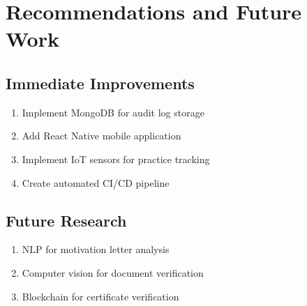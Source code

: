 \documentclass[12pt,a4paper]{report}
\begin{document}
\chapter{Recommendations and Future Work}

\section{Immediate Improvements}
\begin{enumerate}
    \item Implement MongoDB for audit log storage
    \item Add React Native mobile application
    \item Implement IoT sensors for practice tracking
    \item Create automated CI/CD pipeline
\end{enumerate}

\section{Future Research}
\begin{enumerate}
    \item NLP for motivation letter analysis
    \item Computer vision for document verification
    \item Blockchain for certificate verification
\end{enumerate}
\end{document}
